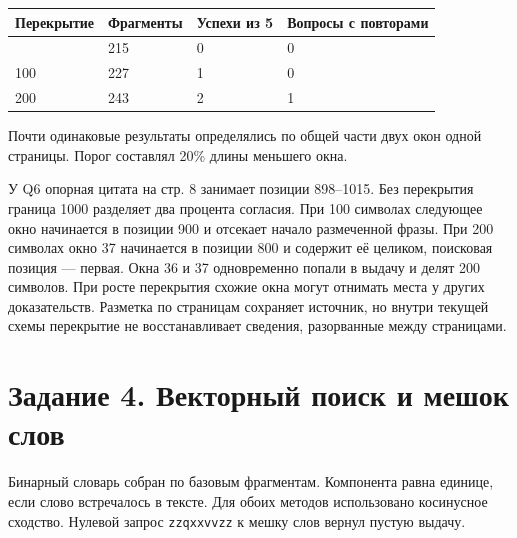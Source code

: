 \documentclass[12pt,a4paper]{article}
\begin{document}
\begin{longtable}[]{@{}llll@{}}
\toprule\noalign{}
Перекрытие & Фрагменты & Успехи из 5 & Вопросы с повторами \\
\midrule\noalign{}
\endhead
\bottomrule\noalign{}
\endlastfoot
0 & 215 & 0 & 0 \\
100 & 227 & 1 & 0 \\
200 & 243 & 2 & 1 \\
\end{longtable}

Почти одинаковые результаты определялись по общей части двух окон одной
страницы. Порог составлял 20\% длины меньшего окна.

У Q6 опорная цитата на стр. 8 занимает позиции 898--1015. Без перекрытия
граница 1000 разделяет два процента согласия. При 100 символах следующее
окно начинается в позиции 900 и отсекает начало размеченной фразы. При
200 символах окно 37 начинается в позиции 800 и содержит её целиком,
поисковая позиция --- первая. Окна 36 и 37 одновременно попали в выдачу
и делят 200 символов. При росте перекрытия схожие окна могут отнимать
места у других доказательств. Разметка по страницам сохраняет источник,
но внутри текущей схемы перекрытие не восстанавливает сведения,
разорванные между страницами.

\hypertarget{ux437ux430ux434ux430ux43dux438ux435-4.-ux432ux435ux43aux442ux43eux440ux43dux44bux439-ux43fux43eux438ux441ux43a-ux438-ux43cux435ux448ux43eux43a-ux441ux43bux43eux432}{%
\section{Задание 4. Векторный поиск и мешок
слов}\label{ux437ux430ux434ux430ux43dux438ux435-4.-ux432ux435ux43aux442ux43eux440ux43dux44bux439-ux43fux43eux438ux441ux43a-ux438-ux43cux435ux448ux43eux43a-ux441ux43bux43eux432}}

Бинарный словарь собран по базовым фрагментам. Компонента равна единице,
если слово встречалось в тексте. Для обоих методов использовано
косинусное сходство. Нулевой запрос \texttt{zzqxxvvzz} к мешку слов
вернул пустую выдачу.
\end{document}
